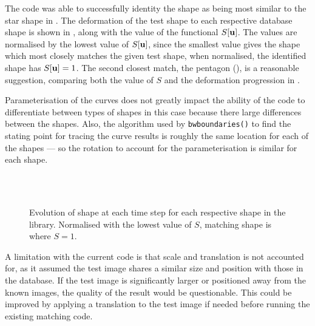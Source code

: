\documentclass[a4paper, 12pt]{article}
\begin{document}
The code was able to successfully identity the shape  as being
most similar to the star shape in . The deformation of the test shape
to each respective database shape is shown in , along with the
value of the functional $S[\mathbf{u}]$. The values are normalised by the lowest
value of $S[\mathbf{u}]$, since the smallest value gives the shape which most closely
matches the given test shape,  when normalised, the identified shape has
$S[\mathbf{u}] = 1$. The second closest match, the pentagon (), is
a reasonable suggestion, comparing both the value of $S$ and the deformation
progression in .

Parameterisation of the curves does not greatly impact the ability of the code
to differentiate between types of shapes in this case because there large
differences between the shapes. Also, the algorithm used by
\texttt{bwboundaries()} to find the stating point for tracing the curve results
is roughly the same location for each of the shapes --- so the rotation to
account for the parameterisation is similar for each shape.

\begin{figure}[h!]
  \centering
  \\
  \\
  \caption{Evolution of shape at each time step for each respective shape in the
    library. Normalised with the lowest value of $S$, matching shape is where $S
  = 1$.}
  \label{fig:shape_match}
\end{figure}

A limitation with the current code is that scale and translation is not
accounted for, as it assumed the test image shares a similar size and position
with those in the database. If the test image is significantly larger or
positioned away from the known images, the quality of the result would be
questionable. This could be improved by applying a translation to the test image
if needed before running the existing matching code.
\end{document}
